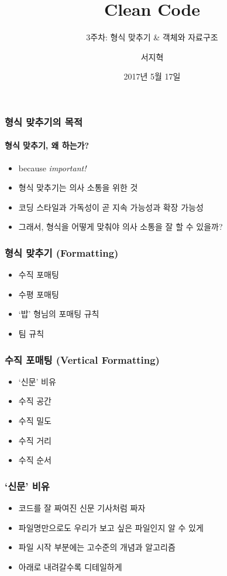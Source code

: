 \documentclass{beamer}
\title{Clean Code}
\subtitle{3주차: 형식 맞추기 \& 객체와 자료구조}
\author{서지혁}
\institute{리디북스 스토어팀}
\date{2017년 5월 17일}
\begin{document}
\frame{\titlepage}

\begin{frame}
    \frametitle{형식 맞추기의 목적}
    \framesubtitle{형식 맞추기, 왜 하는가?}
    \begin{itemize}
        \item because \emph{important!}
        \item 형식 맞추기는 의사 소통을 위한 것
        \item 코딩 스타일과 가독성이 곧 지속 가능성과 확장 가능성
        \item 그래서, 형식을 어떻게 맞춰야 의사 소통을 잘 할 수 있을까?
    \end{itemize}
\end{frame}

\begin{frame}
    \frametitle{형식 맞추기 (Formatting)}
    \begin{itemize}
        \item 수직 포매팅
        \item 수평 포매팅
        \item `밥' 형님의 포매팅 규칙
        \item 팀 규칙
    \end{itemize}
\end{frame}

\begin{frame}
    \frametitle{수직 포매팅 (Vertical Formatting)}
    \begin{itemize}
        \item `신문' 비유
        \item 수직 공간
        \item 수직 밀도
        \item 수직 거리
        \item 수직 순서
    \end{itemize}
\end{frame}

\begin{frame}
    \frametitle{`신문' 비유} 
    \begin{itemize}
        \item 코드를 잘 짜여진 신문 기사처럼 짜자
        \item 파일명만으로도 우리가 보고 싶은 파일인지 알 수 있게
        \item 파일 시작 부분에는 고수준의 개념과 알고리즘
        \item 아래로 내려갈수록 디테일하게
    \end{itemize}
\end{frame}
\end{document}
